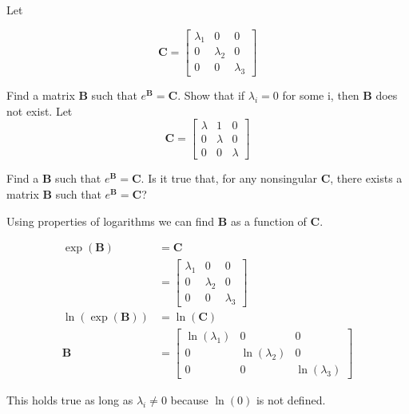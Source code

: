 \item[3.24] Let

\begin{equation*}
\mathbf{C} = \begin{bmatrix}
 \lambda_1 & 0 & 0\\
 0 &  \lambda_2 & 0\\
 0 & 0 & \lambda_3
\end{bmatrix}
\end{equation*}

Find a matrix $\mathbf{B}$ such that $e^{\mathbf{B}} = \mathbf{C}$.
Show that if $\lambda_i = 0$ for some i, then $\mathbf{B}$ does not exist.
Let
\begin{equation*}
 \mathbf{C} = \begin{bmatrix}
      \lambda & 1 & 0\\
      0 & \lambda & 0\\
      0 & 0 & \lambda
     \end{bmatrix}
\end{equation*}

Find a $\mathbf{B}$ such that $e^{\mathbf{B}} = \mathbf{C}$.
Is it true that, for any nonsingular $\mathbf{C}$,
there exists a matrix $\mathbf{B}$ such that $e^{\mathbf{B}} = \mathbf{C}$?


Using properties of logarithms we can find $\mathbf{B}$ as a
function of $\mathbf{C}$.

\begin{align*}
 \exp(\mathbf{B})   &= \mathbf{C}\\
                    &= \begin{bmatrix}
                        \lambda_1 & 0 & 0\\
                        0 & \lambda_2 & 0\\
                        0 & 0 & \lambda_3
                       \end{bmatrix}\\
\ln(\exp(\mathbf{B})) &= \ln(\mathbf{C})\\
\mathbf{B} &= \begin{bmatrix}
                \ln(\lambda_1) & 0 & 0\\
                0 & \ln(\lambda_2 )& 0\\
                0 & 0 & \ln(\lambda_3)
                \end{bmatrix}
\end{align*}

This holds true as long as $\lambda_i \neq 0$ because $\ln(0)$ is not defined.

